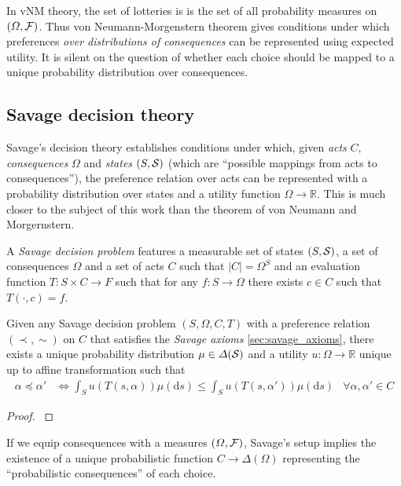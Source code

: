 In vNM theory, the set of lotteries is is the set of all probability measures on $(\Omega,\mathcal{F})$. Thus von Neumann-Morgenstern theorem gives conditions under which preferences \emph{over distributions of consequences} can be represented using expected utility. It is silent on the question of whether each choice should be mapped to a unique probability distribution over consequences.

\subsection{Savage decision theory}

Savage's decision theory establishes conditions under which, given \emph{acts} $C$, \emph{consequences} $\Omega$ and \emph{states} $(S,\mathcal{S})$ (which are ``possible mappings from acts to consequences''), the preference relation over acts can be represented with a probability distribution over states and a utility function $\Omega\to \mathbb{R}$. This is much closer to the subject of this work than the theorem of von Neumann and Morgernstern.

\begin{definition}
A \emph{Savage decision problem} features a measurable set of states $(S,\mathcal{S})$, a set of consequences $\Omega$ and a set of acts $C$ such that $|C|=\Omega^S$ and an evaluation function $T:S\times C\to F$ such that for any $f:S\to \Omega$ there exists $c\in C$ such that $T(\cdot,c)=f$.
\end{definition}

\begin{theorem}
Given any Savage decision problem $(S,\Omega,C,T)$ with a preference relation $(\prec,\sim)$ on $C$ that satisfies the \emph{Savage axioms} \ref{sec:savage_axioms}, there exists a unique probability distribution $\mu\in\Delta(\mathcal{S})$ and a utility $u:\Omega\to \mathbb{R}$ unique up to affine transformation such that
\begin{align}
    \alpha\preceq \alpha' &\iff \int_S u(T(s,\alpha))\mu(\mathrm{d}s) \leq \int_S u(T(s,\alpha'))\mu(\mathrm{d}s)&\forall \alpha,\alpha'\in C
\end{align}
\end{theorem}

\begin{proof}
\citet{savage_foundations_1954}
\end{proof}

If we equip consequences with a measures $(\Omega,\mathcal{F})$, Savage's setup implies the existence of a unique probabilistic function $C\to \Delta(\Omega)$ representing the ``probabilistic consequences'' of each choice.

